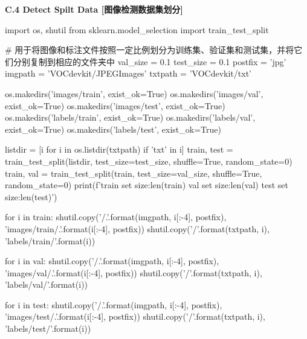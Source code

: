 \documentclass{MathorCupmodeling}
\begin{document}
\textbf{C.4 Detect Spilt Data [图像检测数据集划分]}
\begin{python}
import os, shutil
from sklearn.model_selection import train_test_split

# 用于将图像和标注文件按照一定比例划分为训练集、验证集和测试集，并将它们分别复制到相应的文件夹中
val_size = 0.1
test_size = 0.1
postfix = 'jpg'
imgpath = 'VOCdevkit/JPEGImages'
txtpath = 'VOCdevkit/txt'

os.makedirs('images/train', exist_ok=True)
os.makedirs('images/val', exist_ok=True)
os.makedirs('images/test', exist_ok=True)
os.makedirs('labels/train', exist_ok=True)
os.makedirs('labels/val', exist_ok=True)
os.makedirs('labels/test', exist_ok=True)

listdir = [i for i in os.listdir(txtpath) if 'txt' in i]
train, test = train_test_split(listdir, test_size=test_size, shuffle=True, random_state=0)
train, val = train_test_split(train, test_size=val_size, shuffle=True, random_state=0)
print(f'train set size:{len(train)} val set size:{len(val)} test set size:{len(test)}')

for i in train:
    shutil.copy('{}/{}.{}'.format(imgpath, i[:-4], postfix), 'images/train/{}.{}'.format(i[:-4], postfix))
    shutil.copy('{}/{}'.format(txtpath, i), 'labels/train/{}'.format(i))

for i in val:
    shutil.copy('{}/{}.{}'.format(imgpath, i[:-4], postfix), 'images/val/{}.{}'.format(i[:-4], postfix))
    shutil.copy('{}/{}'.format(txtpath, i), 'labels/val/{}'.format(i))

for i in test:
    shutil.copy('{}/{}.{}'.format(imgpath, i[:-4], postfix), 'images/test/{}.{}'.format(i[:-4], postfix))
    shutil.copy('{}/{}'.format(txtpath, i), 'labels/test/{}'.format(i))
\end{python}
\end{document}
